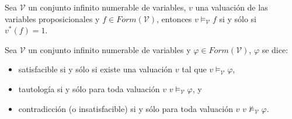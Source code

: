 \begin{definition}
Sea $\mathcal{V}$ un conjunto infinito numerable de variables, $v$ una valuación de las variables proposicionales y $f \in \mathit{Form}(\mathcal{V})$, entonces $v \models_{\mathcal{V}} f$ si y sólo si $v^* (f) = 1$.
\end{definition}

\begin{definition}
Sea $\mathcal{V}$ un conjunto infinito numerable de variables y $\varphi \in \mathit{Form}(\mathcal{V})$, $\varphi$ se dice:
\begin{itemize}
\item satisfacible si y sólo si existe una valuación $v$ tal que $v \models_{\mathcal{V}} \varphi$,
\item tautología si y sólo para toda valuación $v$ $v \models_{\mathcal{V}} \varphi$, y
\item contradicción (o insatisfacible) si y sólo para toda valuación $v$ $v \not\models_{\mathcal{V}} \varphi$.
\end{itemize}
\end{definition}


